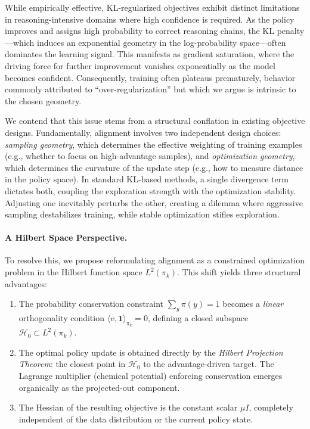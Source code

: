 \documentclass[11pt]{article}
\theoremstyle{definition}
\theoremstyle{remark}
\newcommand{\pik}{\pi_k}
\begin{document}
While empirically effective, KL-regularized objectives exhibit distinct limitations in reasoning-intensive domains where high confidence is required. As the policy improves and assigns high probability to correct reasoning chains, the KL penalty---which induces an exponential geometry in the log-probability space---often dominates the learning signal. This manifests as gradient saturation, where the driving force for further improvement vanishes exponentially as the model becomes confident. Consequently, training often plateaus prematurely, behavior commonly attributed to ``over-regularization'' but which we argue is intrinsic to the chosen geometry.

We contend that this issue stems from a structural conflation in existing objective designs. Fundamentally, alignment involves two independent design choices: \textit{sampling geometry}, which determines the effective weighting of training examples (e.g., whether to focus on high-advantage samples), and \textit{optimization geometry}, which determines the curvature of the update step (e.g., how to measure distance in the policy space). In standard KL-based methods, a single divergence term dictates both, coupling the exploration strength with the optimization stability. Adjusting one inevitably perturbs the other, creating a dilemma where aggressive sampling destabilizes training, while stable optimization stifles exploration.

\paragraph{A Hilbert Space Perspective.}
To resolve this, we propose reformulating alignment as a constrained optimization problem in the Hilbert function space $L^2(\pik)$. This shift yields three structural advantages:
\begin{enumerate}[leftmargin=2em]
    \item The probability conservation constraint $\sum_y \pi(y) = 1$ becomes a \emph{linear} orthogonality condition $\langle v, \mathbf{1}\rangle_{\pik} = 0$, defining a closed subspace $\mathcal{H}_0 \subset L^2(\pik)$.
    \item The optimal policy update is obtained directly by the \emph{Hilbert Projection Theorem}: the closest point in $\mathcal{H}_0$ to the advantage-driven target. The Lagrange multiplier (chemical potential) enforcing conservation emerges organically as the projected-out component.
    \item The Hessian of the resulting objective is the constant scalar $\mu I$, completely independent of the data distribution or the current policy state.
\end{enumerate}
\end{document}
